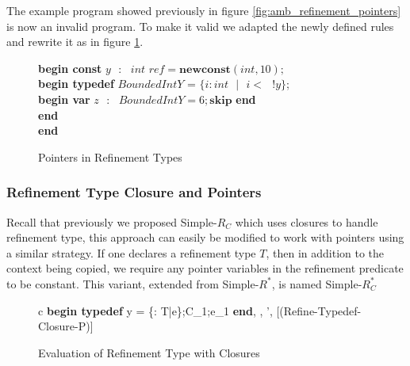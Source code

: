 \documentclass[a4paper,12pt]{report}
\newenvironment{tabs}[1]
 {\flushleft\TabPositions{#1}}
 {\endflushleft}
\begin{document}
\par
The example program showed previously in figure \ref{fig:amb_refinement_pointers} 
is now an invalid program. To make it valid we adapted the newly defined rules 
and rewrite it as in figure \ref{fig:valid_ptr_program}.

\begin{figure} [H]
  \begin{tabs}{1cm,2cm}
    \textbf{begin const }$y\text{ }:\text{ } int\textit{ ref} = \textbf{newconst}(int, 10);$\\
    \tab\textbf{begin typedef }$BoundedIntY$ = $\{i : int\text{ }|\text{ }i <\text{ }!y\}$; \\ 
    \tab\tab\textbf{begin var }$z\text{ }:\text{ }BoundedIntY = 6;\textbf{skip}$\textbf { end} \\
    \tab\textbf {end} \\
    \textbf{end}
  \end{tabs}  
  \caption{Pointers in Refinement Types}
  \label{fig:valid_ptr_program}
\end{figure}


\subsubsection{Refinement Type Closure and Pointers}
Recall that previously we proposed Simple-$R_{C}$ which uses closures to handle 
refinement type, this approach can easily be modified to work with pointers using a 
similar strategy. If one declares a refinement type $T$, then in addition to 
the context being copied, we require any pointer variables in the refinement 
predicate to be constant. This variant, extended from Simple-$R^{*}$, is 
named Simple-$R^{*}_{C}$

\begin{figure}[H]
  \begin{center}
    \begin{tabular} {c}      
      {\langle\textbf{begin typedef } y = \{\upsilon : T\text{ }|\text{ }e\};C_1;e_1\textbf{ end}, 
      \sigma, \tau \rangle \longrightarrow \langle \sigma', \tau \rangle} [(Refine-Typedef-Closure-P)]
    \end{tabular}
  \end{center}
  \caption{Evaluation of Refinement Type with Closures}
\end{figure}
\end{document}

